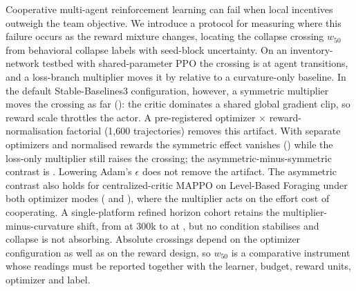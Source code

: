 Cooperative multi-agent reinforcement learning can fail when local incentives outweigh the team objective. We introduce a protocol for measuring where this failure occurs as the reward mixture changes, locating the \AbstractCrossingProbability{} collapse crossing $w_{50}$ from behavioral collapse labels with seed-block uncertainty. On an inventory-network testbed with shared-parameter PPO the crossing is \AbstractCrossing{} at \PrimaryBudget{} agent transitions, and a loss-branch multiplier moves it by \LossMultiplierShift{} relative to a curvature-only baseline. In the default Stable-Baselines3 configuration, however, a symmetric multiplier moves the crossing as far (\VfourSymStd{}): the critic dominates a shared global gradient clip, so reward scale throttles the actor. A pre-registered optimizer $\times$ reward-normalisation factorial (1,600 trajectories) removes this artifact. With separate optimizers and normalised rewards the symmetric effect vanishes (\VfourSymBoth{}) while the loss-only multiplier still raises the crossing; the asymmetric-minus-symmetric contrast is \VfourAsymBoth{}. Lowering Adam's $\epsilon$ does not remove the artifact. The asymmetric contrast also holds for centralized-critic MAPPO on Level-Based Foraging under both optimizer modes (\VfourLBFAsymGlobal{} and \VfourLBFAsymSep{}), where the multiplier acts on the effort cost of cooperating. A single-platform refined horizon cohort retains the multiplier-minus-curvature shift, from \VfourHorizonStart{} at 300k to \VfourHorizonEnd{} at \MaxConfirmationBudget{}, but no condition stabilises and collapse is not absorbing. Absolute crossings depend on the optimizer configuration as well as on the reward design, so $w_{50}$ is a comparative instrument whose readings must be reported together with the learner, budget, reward units, optimizer and label.
